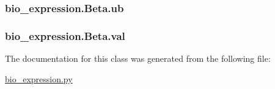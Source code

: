 \hypertarget{classbio__expression_1_1_beta_a0923a6e1480c5747a7eecae9a23ca6ad}{
\subsubsection[{ub}]{\setlength{\rightskip}{0pt plus 5cm}bio\+\_\+expression.\+Beta.\+ub}}\label{classbio__expression_1_1_beta_a0923a6e1480c5747a7eecae9a23ca6ad}
\hypertarget{classbio__expression_1_1_beta_af9ff8e36aac16ad655894d20003fb8af}{
\subsubsection[{val}]{\setlength{\rightskip}{0pt plus 5cm}bio\+\_\+expression.\+Beta.\+val}}\label{classbio__expression_1_1_beta_af9ff8e36aac16ad655894d20003fb8af}


The documentation for this class was generated from the following file\+:\begin{DoxyCompactItemize}
\item 
\hyperlink{bio__expression_8py}{bio\+\_\+expression.\+py}\end{DoxyCompactItemize}

